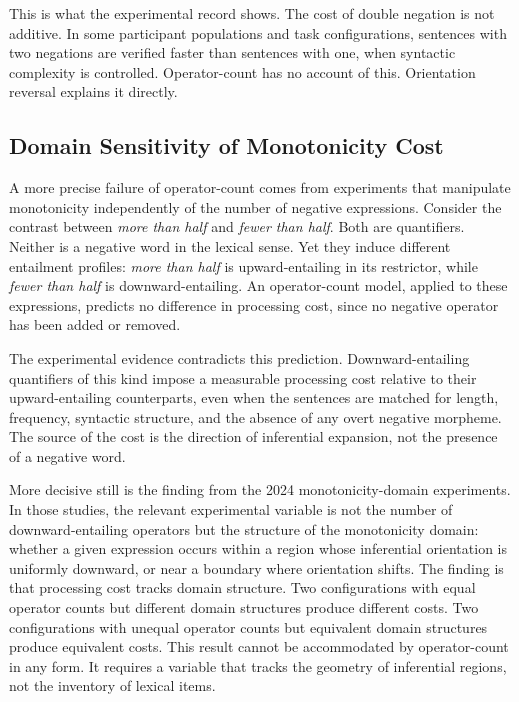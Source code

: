 \documentclass[12pt]{article}
\theoremstyle{remark}
\begin{document}
This is what the experimental record shows. The cost of double negation
is not additive. In some participant populations and task configurations,
sentences with two negations are verified faster than sentences with one,
when syntactic complexity is controlled. Operator-count has no account of
this. Orientation reversal explains it directly.

\subsection{Domain Sensitivity of Monotonicity Cost}

A more precise failure of operator-count comes from experiments that
manipulate monotonicity independently of the number of negative
expressions. Consider the contrast between \emph{more than half} and
\emph{fewer than half}. Both are quantifiers. Neither is a negative word
in the lexical sense. Yet they induce different entailment profiles:
\emph{more than half} is upward-entailing in its restrictor, while
\emph{fewer than half} is downward-entailing. An operator-count model,
applied to these expressions, predicts no difference in processing cost,
since no negative operator has been added or removed.

The experimental evidence contradicts this prediction. Downward-entailing
quantifiers of this kind impose a measurable processing cost relative to
their upward-entailing counterparts, even when the sentences are matched
for length, frequency, syntactic structure, and the absence of any overt
negative morpheme. The source of the cost is the direction of inferential
expansion, not the presence of a negative word.

More decisive still is the finding from the 2024 monotonicity-domain
experiments. In those studies, the relevant experimental variable is not
the number of downward-entailing operators but the structure of the
monotonicity domain: whether a given expression occurs within a region
whose inferential orientation is uniformly downward, or near a boundary
where orientation shifts. The finding is that processing cost tracks
domain structure. Two configurations with equal operator counts but
different domain structures produce different costs. Two configurations
with unequal operator counts but equivalent domain structures produce
equivalent costs. This result cannot be accommodated by operator-count in
any form. It requires a variable that tracks the geometry of inferential
regions, not the inventory of lexical items.
\end{document}
